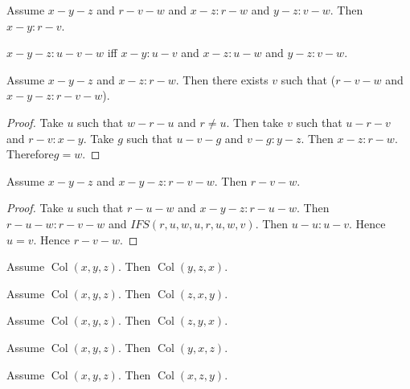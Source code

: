 \documentclass{article}
\newcommand{\Col}[3]{\operatorname{Col}(#1, #2, #3)}
\begin{document}
  \begin{forthel}
    \begin{axiom}[L4o3]
      Assume $x-y-z$ and $r-v-w$ and $x-z : r-w$ and $y-z : v-w$. Then $x-y : r-v$.
    \end{axiom}

    \begin{definition}[L4o4]
      $x-y-z : u-v-w$ iff $x-y : u-v$ and $x-z : u-w$ and $y-z : v-w$.
    \end{definition}

    \begin{lemma}[L4o5]
      Assume $x-y-z$ and $x-z : r-w$. Then there exists $v$ such that ($r-v-w$ and $x-y-z : r-v-w$).
    \end{lemma}
    \begin{proof}
    	Take $u$ such that $w-r-u$ and $r \neq u$. Then take $v$ such that $u-r-v$ and $r-v : x-y$. Take $g$ such that $u-v-g$ and $v-g : y-z$. Then $x-z : r-w$. Therefore$ g = w$.
    \end{proof}

    \begin{lemma}[L4o6]
      Assume $x-y-z$ and $x-y-z : r-v-w$. Then $r-v-w$.
    \end{lemma}
    \begin{proof}
    	Take $u$ such that $r-u-w$ and $x-y-z : r-u-w$.	Then $r-u-w : r-v-w$ and $IFS(r,u,w,u,r,u,w,v)$.	Then $u-u : u-v$. Hence $u = v$. Hence $r-v-w$.
    \end{proof}

    \begin{lemma}[L4o11a]
      Assume $\Col{x}{y}{z}$. Then $\Col{y}{z}{x}$.
    \end{lemma}

    \begin{lemma}[L4o11b]
      Assume $\Col{x}{y}{z}$. Then $\Col{z}{x}{y}$.
    \end{lemma}

    \begin{lemma}[L4o11c]
      Assume $\Col{x}{y}{z}$. Then $\Col{z}{y}{x}$.
    \end{lemma}

    \begin{lemma}[L4o11d]
      Assume $\Col{x}{y}{z}$. Then $\Col{y}{x}{z}$.
    \end{lemma}

    \begin{lemma}[L4o11e]
      Assume $\Col{x}{y}{z}$. Then $\Col{x}{z}{y}$.
    \end{lemma}


\end{forthel}
\end{document}
